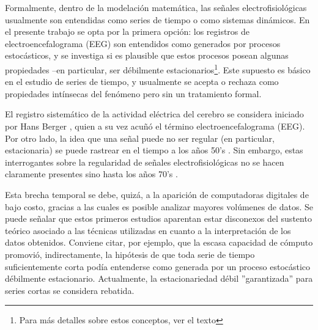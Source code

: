 Formalmente, dentro de la modelaci\'on matem\'atica, las se\~nales electrofisiol\'ogicas usualmente 
son entendidas como series de tiempo o como sistemas din\'amicos.
En el presente trabajo se opta por la primera opci\'on: los registros de electroencefalograma (EEG)
son entendidos como generados por procesos estoc\'asticos, y se investiga si es plausible que estos
procesos posean algunas propiedades --en particular, ser d\'ebilmente estacionarios\footnote{Para
m\'as detalles sobre estos conceptos, ver el texto}.
Este supuesto es b\'asico en el estudio de series de tiempo, y usualmente se acepta o rechaza como 
propiedades int\'insecas del fen\'omeno pero sin un tratamiento formal.

El registro sistem\'atico de la actividad el\'ectrica del cerebro se considera iniciado por Hans 
Berger \cite{Berger29}, quien a su vez acu\~n\'o el t\'ermino electroencefalograma (EEG).
Por otro lado, la idea que una se\~nal puede no ser regular (en particular, estacionaria) se puede 
rastrear en el tiempo a los a\~nos 50’s \cite{Page52,Silverman57}. 
Sin embargo, estas interrogantes sobre la regularidad de se\~nales electrofisiol\'ogicas no se 
hacen claramente presentes sino hasta los a\~nos 70's \cite{Kawabata73,McEwen75,Cohen77,Sugimoto78}.

Esta brecha temporal se debe, quiz\'a, a la aparici\'on de computadoras digitales de bajo costo, 
gracias a las cuales es posible analizar mayores vol\'umenes de datos.
Se puede se\~nalar que estos primeros estudios aparentan estar disconexos del sustento te\'orico 
asociado a las t\'ecnicas  utilizadas en cuanto a la interpretaci\'on de los datos obtenidos. 
Conviene citar, por ejemplo, que la escasa capacidad de c\'omputo promovi\'o, indirectamente, la 
hip\'otesis de que {toda} serie de tiempo suficientemente corta pod\'ia entenderse como generada 
por un proceso estoc\'astico d\'ebilmente estacionario.
Actualmente, la estacionariedad d\'ebil ''garantizada'' para series cortas se considera rebatida\cite{Melard89,Adak98,Klonowski09}.

